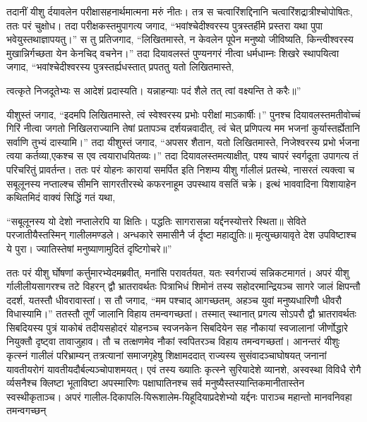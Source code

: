 \adhyAya
{}
\vakya तदानीं यीशु र्दयावलेन परीक्षासहनार्थमात्मना मरुं नीतः।
\vakya तत्र स चत्वारिंशद्दिनानि चत्वारिंशद्रात्रीश्चोपोषितः, ततः परं चुक्षोध।
\vakya तदा परीक्षकस्तमुपागत्य जगाद, “भवांश्चेदीश्वरस्य पुत्रस्तर्हीमे प्रस्तरा यथा पुपा भवेयुस्तथाज्ञापयतु।”
\vakya स तु प्रतिजगाद, “लिखितमास्ते, न केवलेन पूपेन मनुष्यो जीविष्यति, किन्त्वीश्वरस्य मुखान्निर्गच्छता येन केनचिद् वचनेन।”
\vakya तदा दियावलस्तं पुण्यनगरं नीत्वा धर्मधाम्नः शिखरे स्थापयित्वा जगाद,
\vakya “भवांश्चेदीश्वरस्य पुत्रस्तर्ह्यधस्तात् प्रपततु यतो लिखितमास्ते,
\begin{poem}
\startwithline त्वत्कृते निजदूतेभ्यः स आदेशं प्रदास्यति।
\pline यन्नाहन्याः पदं शैले तत् त्वां वक्ष्यन्ति ते करैः॥”
\end{poem}
\vakya यीशुस्तं जगाद, “इदमपि लिखितमास्ते, त्वं स्वेश्वरस्य प्रभोः परीक्षां माऽकार्षीः।”
\vakya पुनश्च दियावलस्तमतीवोच्चं गिरिं नीत्वा जगतो निखिलराज्यानि तेषां प्रतापञ्च दर्शयन्नवादीत्,
\vakya त्वं चेत् प्रणिपत्य मम भजनां कुर्यास्तर्ह्येतानि सर्वाणि तुभ्यं दास्यामि।”
\vakya तदा यीशुस्तं जगाद, “अपसर शैतान, यतो लिखितमास्ते, निजेश्वरस्य प्रभो र्भजना त्वया कर्तव्या,एकश्च स एव त्वयाराधयितव्यः।”
\vakya तदा दियावलस्तमत्याक्षीत्, पश्य चापरं स्वर्गदूता उपागत्य तं परिचरितुं प्रावर्तन्त।
\vakya ततः परं योहनः कारायां समर्पित इति निशम्य यीशु र्गालीलं प्रतस्थे,
\vakya नासरतं त्यक्त्वा च सबूलूनस्य नप्ताल्श्च सीमनि सागरतीरस्थे कफरनाहूम उपस्थाय वसतिं चक्रे।
\vakya इत्थं भाववादिना यिशायाहेन कथितमिदं वाक्यं सिद्धिं गतं यथा,
\begin{poem}
\startwithvakya “सबूलूनस्य यो देशो नप्तालेरपि या क्षितिः।
\pline पद्धतिः सागरासन्ना यर्द्दनस्योत्तरे स्थिता॥
\pline सेविते परजातीयैस्तस्मिन् गालीलमण्डले।
\pline अन्धकारे समासीनै र्ज र्दृष्टा महाद्युतिः॥
\vakya मृत्युच्छायावृते देश उपविष्टाश्च ये पुरा।
\pline ज्यातिस्तेषां मनुष्याणामुदितं दृष्टिगोचरे॥”
\end{poem}
\vakya ततः परं यीशु र्घोषणां कर्त्तुमारभ्येदमब्रवीत्, मनांसि परावर्तयत, यतः स्वर्गराज्यं सन्निकटमागतं।
\vakya अपरं यीशु र्गालीलीयसागरश्च तटे विहरन् द्वौ भ्रातरावर्थतः पित्राभिधं शिमोनं तस्य सहोदरमान्द्रियञ्च सागरे जालं क्षिपन्तौ ददर्श, यतस्तौ धीवरावास्तां।
\vakya स तौ जगाद, “मम पश्चाद् आगच्छतम्, अहञ्च युवां मनुष्यधारिणौ धीवरौ विधास्यामि।”
\vakya ततस्तौ तूर्णं जालानि विहाय तमन्वगच्छतां।
\vakya तस्मात् स्थानात् प्रगत्य सोऽपरौ द्वौ भ्रातरावर्थतः सिबदियस्य पुत्रं याकोबं तदीयसहोदरं योहनञ्च स्वजनकेन सिबदियेन सह नौकायां स्वजालानां जीर्णोद्धारे नियुक्तौ दृष्ट्वा तावाजुहाव।
\vakya तौ च तत्क्षणमेव नौकां स्वपितरञ्च विहाय तमन्वगच्छतां।
\vakya आनन्तरं यीशुः कृत्स्नं गालीलं परिभ्राम्यन् तत्रत्यानां समाजगृहेषु शिक्षामददात् राज्यस्य सुसंवादञ्चाघोषयत् जनानां यावतीयरोगं यावतीयदौर्बल्यञ्चोपाशमयत्।
\vakya एवं तस्य ख्यातिः कृत्स्ने सुरियादेशे व्यानशे, अस्वस्था विविधै रोगै र्व्यसनैश्च क्लिष्टा भूताविष्टा अपस्मारिणः पक्षाघातिनश्च सर्व मनुष्यैस्तस्यान्तिकमानीतास्तेन स्वस्थीकृताञ्च।
\vakya अपरं गालील-दिकापलि-यिरूशालेम-यिहूदियाप्रदेशेभ्यो यर्द्दनः पाराञ्च महान्तो मानवनिवहा तमन्वगच्छन्\eoc